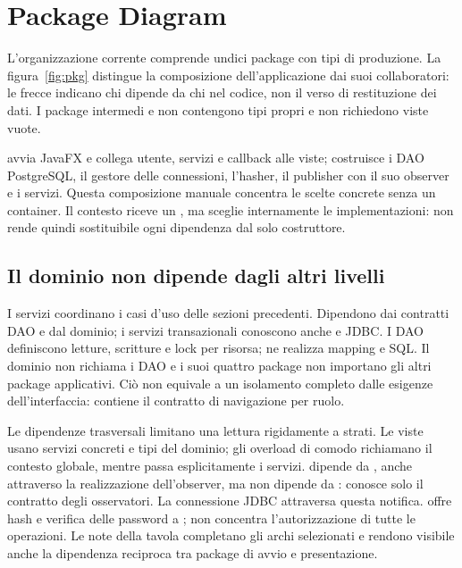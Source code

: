 \def\UrlBreaks{\do\a\do\b\do\c\do\d\do\e\do\f\do\g\do\h\do\i\do\j\do\k\do\l\do\m\do\n\do\o\do\p\do\q\do\r\do\s\do\t\do\u\do\v\do\w\do\x\do\y\do\z\do\A\do\B\do\C\do\D\do\E\do\F\do\G\do\H\do\I\do\J\do\K\do\L\do\M\do\N\do\O\do\P\do\Q\do\R\do\S\do\T\do\U\do\V\do\W\do\X\do\Y\do\Z}
\section{Package Diagram}\label{sec:package}
L'organizzazione corrente comprende undici package con tipi di produzione.
La figura~\ref{fig:pkg} distingue la composizione dell'applicazione dai suoi
collaboratori: le frecce indicano chi dipende da chi nel codice, non il verso
di restituzione dei dati. I package intermedi  e
 non contengono tipi propri e non richiedono viste vuote.

 avvia JavaFX e collega utente, servizi e callback alle viste;
 costruisce i DAO PostgreSQL, il gestore delle connessioni,
l'hasher, il publisher con il suo observer e i servizi. Questa composizione
manuale concentra le scelte concrete senza un container. Il contesto riceve
un , ma sceglie internamente le implementazioni:
non rende quindi sostituibile ogni dipendenza dal solo costruttore.

\subsection*{Il dominio non dipende dagli altri livelli}
I servizi coordinano i casi d'uso delle sezioni precedenti. Dipendono dai
contratti DAO e dal dominio; i servizi transazionali conoscono anche
 e JDBC. I DAO definiscono letture, scritture e lock
per risorsa;  ne realizza mapping e SQL. Il dominio
non richiama i DAO e i suoi quattro package non importano gli altri
package applicativi. Ciò non equivale a un isolamento completo dalle
esigenze dell'interfaccia:  contiene il contratto di
navigazione per ruolo.

\clearpage

Le dipendenze trasversali limitano una lettura rigidamente a strati.
Le viste usano servizi concreti e tipi del dominio; gli overload di comodo
richiamano il contesto globale, mentre  passa esplicitamente i
servizi.  dipende da , anche attraverso la
realizzazione dell'observer, ma  non dipende da :
conosce solo il contratto degli osservatori. La connessione JDBC attraversa
questa notifica.  offre hash e verifica delle password a
; non concentra l'autorizzazione di tutte le operazioni.
Le note della tavola completano gli archi selezionati e rendono visibile
anche la dipendenza reciproca tra package di avvio e presentazione.

